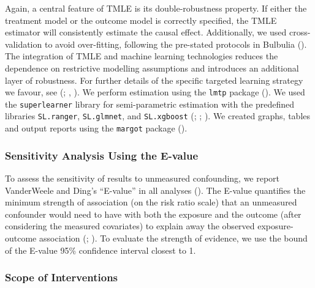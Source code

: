 \documentclass[
  single column]{article}
\begin{document}
Again, a central feature of TMLE is its double-robustness property. If
either the treatment model or the outcome model is correctly specified,
the TMLE estimator will consistently estimate the causal effect.
Additionally, we used cross-validation to avoid over-fitting, following
the pre-stated protocols in Bulbulia
(). The integration of TMLE
and machine learning technologies reduces the dependence on restrictive
modelling assumptions and introduces an additional layer of robustness.
For further details of the specific targeted learning strategy we
favour, see (;
,
). We perform estimation using the
\texttt{lmtp} package (). We used the \texttt{superlearner} library for semi-parametric
estimation with the predefined libraries \texttt{SL.ranger},
\texttt{SL.glmnet}, and \texttt{SL.xgboost}
(;
;
). We created graphs,
tables and output reports using the \texttt{margot} package
().

\subsubsection{Sensitivity Analysis Using the
E-value}\label{sensitivity-analysis-using-the-e-value}

To assess the sensitivity of results to unmeasured confounding, we
report VanderWeele and Ding's ``E-value'' in all analyses
(). The E-value
quantifies the minimum strength of association (on the risk ratio scale)
that an unmeasured confounder would need to have with both the exposure
and the outcome (after considering the measured covariates) to explain
away the observed exposure-outcome association
(;
). To
evaluate the strength of evidence, we use the bound of the E-value 95\%
confidence interval closest to 1.

\subsubsection{Scope of Interventions}\label{scope-of-interventions}
\end{document}
